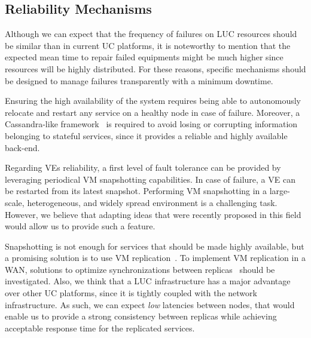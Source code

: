 \subsection{Reliability Mechanisms}
Although we can expect that  the frequency of failures on LUC resources should be similar than 
in current UC platforms, it is noteworthy to mention that the expected mean time to repair failed equipments might be much higher 
since resources will be highly distributed. For these reasons, specific 
mechanisms should be designed to manage failures transparently
with a minimum downtime. 


Ensuring the high availability of the \discovery system requires being able to
autonomously relocate and restart any service on a healthy node in case of failure.
Moreover, a Cassandra-like framework~\cite{lakshman:2010} is required
to avoid losing or corrupting
information belonging to stateful services, 
since it provides a reliable and highly available back-end.

Regarding VEs reliability, a first level of fault tolerance can be
provided by leveraging periodical VM snapshotting capabilities.
In case of failure, a VE can be restarted from its latest snapshot.
Performing VM snapshotting in a large-scale,
heterogeneous, and widely spread environment is a challenging
task. However, we believe that adapting ideas that were recently proposed
in this field~\cite{nicolae:2011} would allow us to provide such
a feature.

Snapshotting is not enough for services that should be made highly
available, but a promising solution is to use VM
replication~\cite{Petrovic2012}. To implement VM replication in a WAN,
solutions to optimize synchronizations between
replicas~\cite{gerofi:2012,rajagopalan:2012} should be
investigated. Also, we think that a LUC infrastructure has a major advantage over
other UC platforms, since it is tightly coupled with the network
infrastructure. As such, we can expect \emph{low} latencies between
nodes, that would enable us to provide a strong consistency between
replicas while achieving acceptable response time for the replicated
services. 



